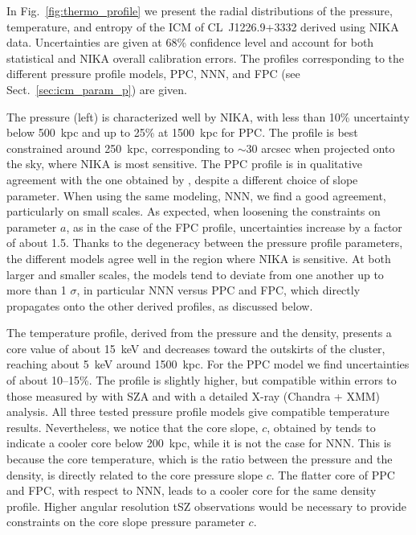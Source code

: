 \documentclass[twocolumn,traditabstract]{aa}
\begin{document}
In Fig.~\ref{fig:thermo_profile} we present the radial distributions of the pressure, temperature, and entropy of the ICM of \mbox{CL~J1226.9+3332} derived using NIKA data. Uncertainties are given at 68\% confidence level and account for both statistical and NIKA overall calibration errors. The profiles corresponding to the different pressure profile models, PPC, NNN, and FPC (see Sect.~\ref{sec:icm_param_p}) are given.

The pressure (left) is characterized well by NIKA, with less than 10\% uncertainty below 500~kpc and up to 25\% at 1500~kpc for PPC. The profile is best constrained around 250~kpc, corresponding to $\sim$30 arcsec when projected onto the sky, where NIKA is most sensitive. The PPC profile is in qualitative agreement with the one obtained by \cite{mroczkowski2009}, despite a different choice of slope parameter. When using the same modeling, NNN, we find a good agreement, particularly on small scales. As expected, when loosening the constraints on parameter $a$, as in the case of the FPC profile, uncertainties increase by a factor of about 1.5. Thanks to the degeneracy between the pressure profile parameters, the different models agree well in the region where NIKA is sensitive. At both larger and smaller scales, the models tend to deviate from one another up to more than 1 $\sigma$, in particular NNN versus PPC and FPC, which directly propagates onto the other derived profiles, as discussed below.

The temperature profile, derived from the pressure and the density, presents a core value of about 15~keV and decreases toward the outskirts of the cluster, reaching about 5~keV around 1500~kpc. For the PPC model we find uncertainties of about 10--15\%. The profile is slightly higher, but compatible within errors to those measured by \cite{mroczkowski2009} with SZA and \cite{maughan2007} with a detailed \mbox{X-ray} (Chandra + XMM) analysis. All three tested pressure profile models give compatible temperature results. Nevertheless, we notice that the core slope, $c$, obtained by \cite{comis2011} tends to indicate a cooler core below 200~kpc, while it is not the case for NNN. This is because the core temperature, which is the ratio between the pressure and the density, is directly related to the core pressure slope $c$. The flatter core of PPC and FPC, with respect to NNN, leads to a cooler core for the same density profile. Higher angular resolution tSZ observations would be necessary to provide constraints on the core slope pressure parameter $c$.
\end{document}
